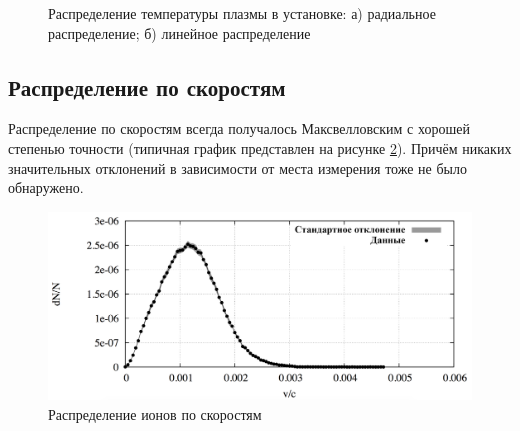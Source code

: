 \begin{figure}[h!]
	\begin{minipage}[h]{0.89\linewidth}
	\end{minipage}
	\hfill
	\begin{minipage}[h]{0.89\linewidth}
	\end{minipage}
	\caption{Распределение температуры плазмы в установке: а) радиальное распределение; б) линейное распределение}
	\label{fig:temperature}
\end{figure}

\subsection{Распределение по скоростям}

Распределение по скоростям всегда получалось Максвелловским с хорошей степенью точности (типичная график представлен на рисунке \ref{fig:maxwell}). Причём никаких значительных отклонений в зависимости от места измерения тоже не было обнаружено.

\begin{figure}[h!]
	\centering
	\includegraphics[width=0.75\linewidth]{fig/ch5/maxwell}
	\caption{Распределение ионов по скоростям}
	\label{fig:maxwell}
\end{figure}



